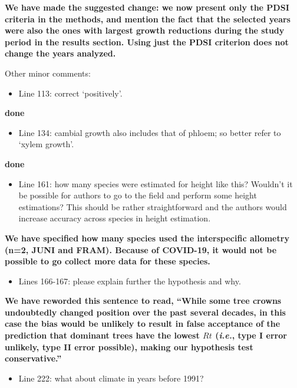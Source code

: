 \documentclass[
]{article}
\providecommand{\tightlist}{%
  \setlength{\itemsep}{0pt}\setlength{\parskip}{0pt}}
\begin{document}
\textbf{We have made the suggested change: we now present only the PDSI
criteria in the methods, and mention the fact that the selected years
were also the ones with largest growth reductions during the study
period in the results section. Using just the PDSI criterion does not
change the years analyzed.}

Other minor comments:

\begin{itemize}
\tightlist
\item
  Line 113: correct `positively'.
\end{itemize}

\textbf{done}

\begin{itemize}
\tightlist
\item
  Line 134: cambial growth also includes that of phloem; so better refer
  to `xylem growth'.
\end{itemize}

\textbf{done}

\begin{itemize}
\tightlist
\item
  Line 161: how many species were estimated for height like this?
  Wouldn't it be possible for authors to go to the field and perform
  some height estimations? This should be rather straightforward and the
  authors would increase accuracy across species in height estimation.
\end{itemize}

\textbf{We have specified how many species used the interspecific
allometry (n=2, JUNI and FRAM). Because of COVID-19, it would not be
possible to go collect more data for these species.}

\begin{itemize}
\tightlist
\item
  Lines 166-167: please explain further the hypothesis and why.
\end{itemize}

\textbf{We have reworded this sentence to read, ``While some tree crowns
undoubtedly changed position over the past several decades, in this case
the bias would be unlikely to result in false acceptance of the
prediction that dominant trees have the lowest \(Rt\) (\emph{i.e.}, type
I error unlikely, type II error possible), making our hypothesis test
conservative.''}

\begin{itemize}
\tightlist
\item
  Line 222: what about climate in years before 1991?
\end{itemize}
\end{document}
